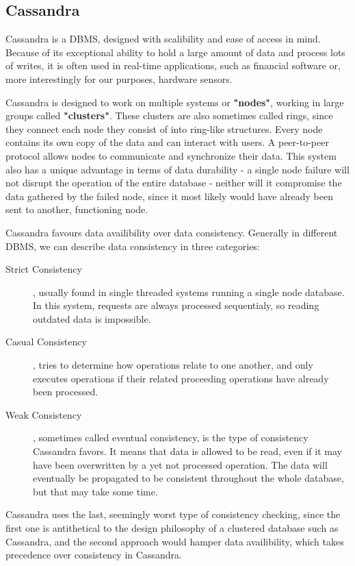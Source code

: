 \subsection{Cassandra}
\label{subsec:background:second_section:first_subsection}
\par Cassandra is a DBMS, designed with scalibility and ease of access in mind. Because of its exceptional ability to hold a large amount of data and process lots of writes, it is often used in real-time applications, such as financial software or, more interestingly for our purposes, hardware sensors\citep{CassandraUseCase}. 
\par Cassandra is designed to work on multiple systems or \textbf{"nodes"}, working in large groups called \textbf{"clusters"}. These clusters are also sometimes called rings, since they connect each node they consist of into ring-like structures. Every node contains its own copy of the data and can interact with users. A peer-to-peer protocol allows nodes to communicate and synchronize their data. This system also has a unique advantage in terms of data durability - a single node failure will not disrupt the operation of the entire database - neither will it compromise the data gathered by the failed node, since it most likely would have already been sent to another, functioning node\citep{HewittCassandra}.
\par Cassandra favours data availibility over data consistency. Generally in different DBMS, we can describe data consistency in three categories:
\begin{description}
  \item [Strict Consistency], usually found in single threaded systems running a single node database. In this system, requests are always processed sequentialy, so reading outdated data is impossible.
  \item [Casual Consistency], tries to determine how operations relate to one another, and only executes operations if their related proceeding operations have already been processed.
  \item [Weak Consistency], sometimes called eventual consistency, is the type of consistency Cassandra favors. It means that data is allowed to be read, even if it may have been overwritten by a yet not processed operation. The data will eventually be propagated to be consistent throughout the whole database, but that may take some time.
\end{description}
\par Cassandra uses the last, seemingly worst type of consistency checking, since the first one is antithetical to the design philosophy of a clustered database such as Cassandra, and the second approach would hamper data availibility, which takes precedence over consistency in Cassandra\citep{HewittCassandra}.
